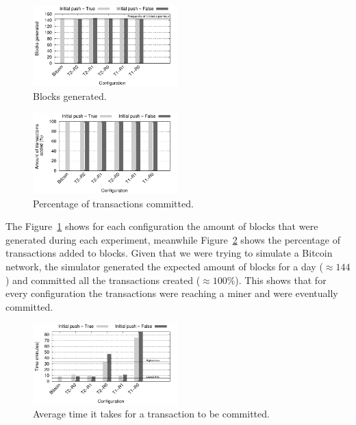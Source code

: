 \documentclass{dads}   %
\begin{document}
\begin{figure}
\centering
\includegraphics[width=0.5\textwidth]{plots/blocks-gen.pdf}
\caption{Blocks generated.}
\label{fig:nb-blocks}
\end{figure}

\begin{figure}
\centering
\includegraphics[width=0.5\textwidth]{plots/tx-added.pdf}
\caption{Percentage of transactions committed.}
\label{fig:tx-added}
\end{figure}

The Figure~\ref{fig:nb-blocks} shows for each configuration the amount of blocks that were generated during each experiment, meanwhile Figure~\ref{fig:tx-added} shows the percentage of transactions added to blocks. Given that we were trying to simulate a Bitcoin network, the simulator generated the expected amount of blocks for a day ($\approx 144$) and committed all the transactions created ($\approx 100\%$). This shows that for every configuration the transactions were reaching a miner and were eventually committed.

\begin{figure}
\centering
\includegraphics[width=0.5\textwidth]{plots/commit-time.pdf}
\caption{Average time it takes for a transaction to be committed.}
\label{fig:commit-time}
\end{figure}
\end{document}
